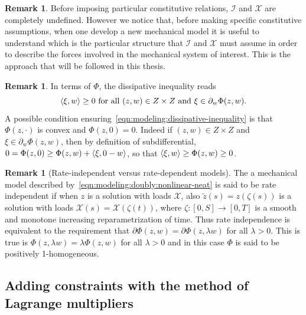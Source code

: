 \documentclass[a4paper,10pt,oneside]{amsbook}
\numberwithin{section}{chapter}
\numberwithin{equation}{chapter}
\theoremstyle{definition}
\newtheorem{rmk}[prop]{Remark}
\DeclarePairedDelimiter{\dual}{\langle}{\rangle}
\begin{document}
\begin{rmk}
Before imposing particular constitutive relations, $\mathcal{I}$ and $\mathcal{X}$ are completely undefined. However we notice that, before making specific constitutive assumptions, when one develop a new mechanical model it is useful to understand which is the particular structure that $\mathcal{I}$ and $\mathcal{X}$ must assume in order to describe the forces involved in the mechanical system of interest. This is the approach that will be followed in this thesis.
\end{rmk}
\begin{rmk}
In terms of $\Phi$, the dissipative inequality reads
\begin{equation}
\label{eqn:modeling:dissipative-inequality}
\text{$\dual{\xi,w}\ge0$ for all $(z,w)\in Z\times Z$ and $\xi\in\partial_w\Phi(z,w)$}.
\end{equation}
A possible condition ensuring~\eqref{eqn:modeling:dissipative-inequality} is that $\Phi(z,\cdot)$ is convex and $\Phi(z,0)=0$. Indeed if $(z,w)\in Z\times Z$ and $\xi\in\partial_w\Phi(z,w)$, then by definition of subdifferential, $0=\Phi(z,0)\ge\Phi(z,w)+\dual{\xi,0-w}$, so that $\dual{\xi,w}\ge\Phi(z,w)\ge0$.
\end{rmk}
\begin{rmk}[Rate-independent versus rate-dependent models]
The a mechanical model described by~\eqref{eqn:modeling:doubly:nonlinear-neat} is said to be rate independent if when $z$ is a solution with loads $\mathcal{X}$, also $\tilde z(s)=z(\zeta(s))$ is a solution with loads $\mathcal{X}(s)=\mathcal{X}(\zeta(t))$, where $\zeta\colon[0,S]\to[0,T]$ is a smooth and monotone increasing reparametrization of time. Thus rate independence is equivalent to the requirement that $\partial\Phi(z,w)=\partial\Phi(z,\lambda w)$ for all $\lambda>0$. This is true is $\Phi(z,\lambda w)=\lambda\Phi(z,w)$ for all $\lambda>0$ and in this case $\Phi$ is said to be positively 1-homogeneous.
\end{rmk}

\subsection{Adding constraints with the method of Lagrange multipliers}
\label{subsec:lagrange-multipliers}
\end{document}
